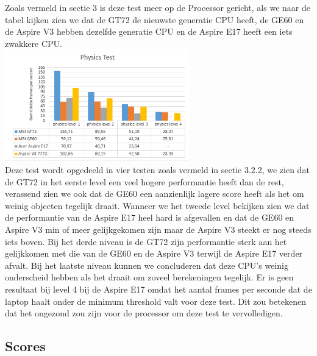 Zoals vermeld in sectie 3 is deze test meer op de Processor gericht, als we naar de tabel kijken zien we dat de GT72 de nieuwste generatie CPU heeft, de GE60 en de Aspire V3 hebben dezelfde generatie CPU en de Aspire E17 heeft een iets zwakkere CPU.\\
\includegraphics[width=8cm]{physics}\\
Deze test wordt opgedeeld in vier testen zoals vermeld in sectie 3.2.2, we zien dat de GT72 in het eerste level een veel hogere performantie heeft dan de rest, verassend zien we ook dat de GE60 een aanzienlijk lagere score heeft als het om weinig objecten tegelijk draait.
Wanneer we het tweede level bekijken zien we dat de performantie van de Aspire E17 heel hard is afgevallen en dat de GE60 en Aspire V3 min of meer gelijkgekomen zijn maar de Aspire V3 steekt er nog steeds iets boven.
Bij het derde niveau is de GT72 zijn performantie sterk aan het gelijkkomen met die van de GE60 en de Aspire V3 terwijl de Aspire E17 verder afvalt.
Bij het laatste niveau kunnen we concluderen dat deze CPU's weinig onderscheid hebben als het draait om zoveel berekeningen tegelijk. Er is geen resultaat bij level 4 bij de Aspire E17 omdat het aantal frames per seconde dat de laptop haalt onder de minimum threshold valt voor deze test. Dit zou betekenen dat het ongezond zou zijn voor de processor om deze test te vervolledigen.

\subsection{Scores}

